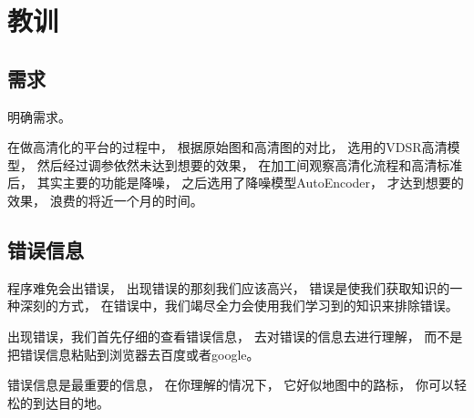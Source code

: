 
\chapter{教训}

\section{需求}

明确需求。

在做高清化的平台的过程中，
根据原始图和高清图的对比，
选用的VDSR高清模型，
然后经过调参依然未达到想要的效果，
在加工间观察高清化流程和高清标准后，
其实主要的功能是降噪，
之后选用了降噪模型AutoEncoder，
才达到想要的效果，
浪费的将近一个月的时间。



\section{错误信息}

程序难免会出错误，
出现错误的那刻我们应该高兴，
错误是使我们获取知识的一种深刻的方式，
在错误中，我们竭尽全力会使用我们学习到的知识来排除错误。

出现错误，我们首先仔细的查看错误信息，
去对错误的信息去进行理解，
而不是把错误信息粘贴到浏览器去百度或者google。

错误信息是最重要的信息，
在你理解的情况下，
它好似地图中的路标，
你可以轻松的到达目的地。




